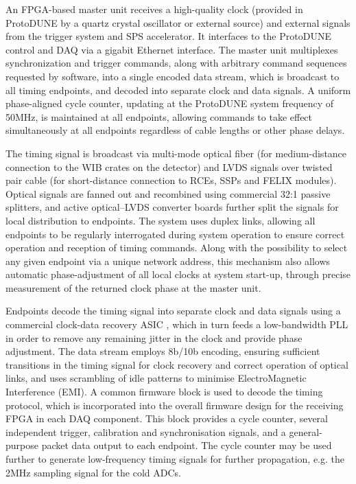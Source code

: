 An FPGA-based master unit receives a high-quality clock (provided in
ProtoDUNE by a quartz crystal oscillator or external source) 
and external signals from the
trigger system and SPS accelerator. It interfaces to the ProtoDUNE control
and DAQ via a gigabit Ethernet interface. The master unit multiplexes
synchronization and trigger commands, along with arbitrary command
sequences requested by software, into a single encoded data stream,
which is broadcast to all timing endpoints, and decoded into separate clock
and data signals. A uniform phase-aligned cycle counter, updating at the
ProtoDUNE system frequency of 50MHz, is maintained at all endpoints,
allowing commands to take effect simultaneously at all endpoints
regardless of cable lengths or other phase delays.

The timing signal is broadcast via multi-mode optical fiber (for
medium-distance connection to the WIB crates on the detector) and LVDS
signals over twisted pair cable (for short-distance connection to RCEs,
SSPs and FELIX modules). Optical signals are fanned out and recombined
using commercial 32:1 passive splitters, and active optical--LVDS
converter boards further split the signals for local distribution to
endpoints. The system uses duplex links, allowing all endpoints to be
regularly interrogated during system operation to ensure correct operation
and reception of timing commands. Along with the possibility to select
any given endpoint via a unique network address, this mechanism also
allows automatic phase-adjustment of all local clocks at system start-up,
through precise measurement of the returned clock phase at the master unit.

Endpoints decode the timing signal into separate clock and data
signals using a commercial clock-data recovery ASIC \cite{siliconlabs:Si5344}, which in turn
feeds a low-bandwidth PLL in order to remove any remaining jitter in
the clock and provide phase adjustment. The data stream employs 8b/10b
encoding, ensuring sufficient transitions in the timing signal for clock
recovery and correct operation of optical links, and uses scrambling
of idle patterns to minimise ElectroMagnetic Interference (EMI).
 A common firmware block is used to
decode the timing protocol, which is incorporated into the overall
firmware design for the receiving FPGA in each DAQ component. This
block provides a cycle counter, several independent trigger, calibration and 
synchronisation signals, and a general-purpose packet data output to each endpoint.
The cycle counter may be used further to generate low-frequency timing signals for
further propagation, e.g. the 2MHz sampling signal for the cold ADCs.

